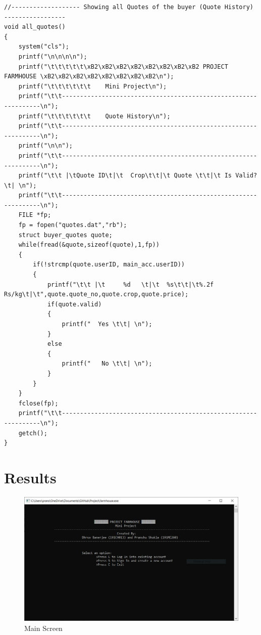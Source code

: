 \documentclass[12pt]{article}
\begin{document}
\begin{lstlisting}
//------------------- Showing all Quotes of the buyer (Quote History)  -----------------
void all_quotes()
{
    system("cls");
    printf("\n\n\n\n");
    printf("\t\t\t\t\t\xB2\xB2\xB2\xB2\xB2\xB2\xB2\xB2 PROJECT FARMHOUSE \xB2\xB2\xB2\xB2\xB2\xB2\xB2\xB2\n");
    printf("\t\t\t\t\t\t    Mini Project\n");
    printf("\t\t----------------------------------------------------------------\n");
    printf("\t\t\t\t\t\t    Quote History\n");
    printf("\t\t----------------------------------------------------------------\n");
    printf("\n\n");
    printf("\t\t----------------------------------------------------------------\n");
    printf("\t\t |\tQuote ID\t|\t  Crop\t\t|\t Quote \t\t|\t Is Valid? \t| \n");
    printf("\t\t----------------------------------------------------------------\n");
    FILE *fp;
    fp = fopen("quotes.dat","rb");
    struct buyer_quotes quote;
    while(fread(&quote,sizeof(quote),1,fp))
    {
        if(!strcmp(quote.userID, main_acc.userID))
        {
            printf("\t\t |\t     %d   \t|\t  %s\t\t|\t%.2f Rs/kg\t|\t",quote.quote_no,quote.crop,quote.price);
            if(quote.valid)
            {
                printf("  Yes \t\t| \n");
            }
            else
            {
                printf("   No \t\t| \n");
            }
        }
    }
    fclose(fp);
    printf("\t\t----------------------------------------------------------------\n");
    getch();
}

\end{lstlisting}

\newpage            %
\section{Results}   %

\begin{figure}[h!]
    \centering
    \includegraphics[width = \columnwidth]{ScreenShots/Main_Page.JPG} 
    \caption{Main Screen}
\end{figure}
\end{document}

